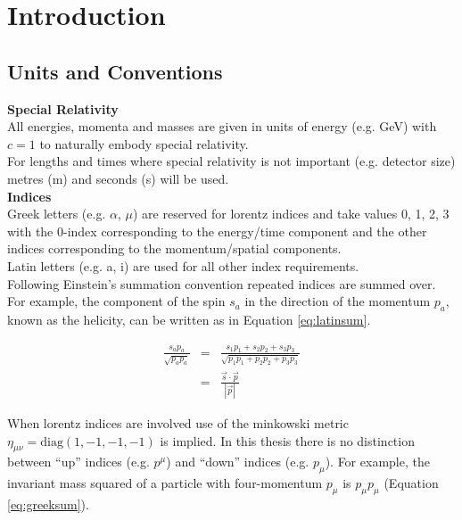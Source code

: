 \chapter{Introduction}

\section{Units and Conventions}

{\bf Special Relativity} \\

All energies, momenta and masses are given in units of energy (e.g. GeV) with
$c=1$ to naturally embody special relativity. \\

For lengths and times where special relativity is not important (e.g. detector
size) metres (m) and seconds (s) will be used. \\

{\bf Indices} \\

Greek letters (e.g. $\alpha$, $\mu$) are reserved for lorentz indices and take
values 0, 1, 2, 3 with the 0-index corresponding to the energy/time component
and the other indices corresponding to the momentum/spatial components. \\

Latin letters (e.g. a, i) are used for all other index requirements. \\

Following Einstein's summation convention repeated indices are summed over. For 
example, the component of the spin $s_{a}$ in the direction of the momentum 
$p_{a}$, known as the helicity, can be written as in Equation \ref{eq:latinsum}.

\begin{eqnarray}
\frac{s_{a}p_{a}}{\sqrt{p_{a}p_{a}}} &=& \frac{s_{1}p_{1} + s_{2}p_{2} + s_{3}p_{3}}
{\sqrt{p_{1}p_{1} + p_{2}p_{2} + p_{3}p_{3}}} \nonumber \\
&=& \frac{\vec{s}\cdot\vec{p}}{|\vec{p}|}
\label{eq:latinsum}
\end{eqnarray}

When lorentz indices are involved use of the minkowski metric $\eta_{\mu\nu} =
\mathrm{diag}(1, -1, -1, -1)$ is implied. In this thesis there is no distinction 
between ``up'' indices (e.g. $p^{\mu}$) and ``down'' indices (e.g. $p_{\mu}$). 
For example, the invariant mass squared of a particle with four-momentum 
$p_{\mu}$ is $p_{\mu}p_{\mu}$ (Equation \ref{eq:greeksum}). 

